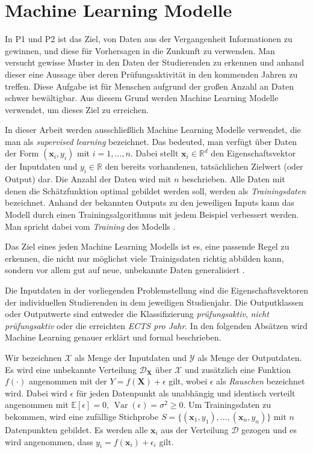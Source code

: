

\section{Machine Learning Modelle}
\label{sec:ml}

In P1 und P2 ist das Ziel, von Daten aus der Vergangenheit Informationen zu gewinnen, und diese f\"ur Vorhersagen in die Zunkunft zu verwenden.
Man versucht gewisse Muster in den Daten der Studierenden zu erkennen und anhand dieser eine Aussage \"uber deren Pr\"ufungsaktivit\"at in den kommenden Jahren zu treffen.
Diese Aufgabe ist f\"ur Menschen aufgrund der gro{\ss}en Anzahl an Daten schwer bew\"altigbar. Aus diesem Grund werden Machine Learning Modelle verwendet,
um dieses Ziel zu erreichen.

In dieser Arbeit werden ausschlie{\ss}lich Machine Learning Modelle verwendet, die man als \textit{supervised learning} bezeichnet.
Das bedeuted, man verf\"ugt \"uber Daten der Form $(\mathbf{x}_i, y_i)$ mit $i = 1,\dots,n$. Dabei stellt $\mathbf{x}_i \in \mathbb{R}^d$ den Eigenschaftsvektor
der Inputdaten und $y_i \in \mathbb{R}$ den bereits vorhandenen, tats\"achlichen Zielwert (oder Output) dar. Die Anzahl der Daten wird mit $n$ beschrieben. Alle Daten mit denen die
Sch\"atzfunktion optimal gebildet werden soll, werden als \textit{Trainingsdaten} bezeichnet.
Anhand der bekannten Outputs zu den jeweiligen Inputs kann das Modell durch einen Trainingsalgorithmus mit jedem Beispiel verbessert werden.
Man spricht dabei vom \textit{Training} des Modells \cite[Seiten 19 bis 25]{shalev}.

Das Ziel eines jeden Machine Learning Modells ist es, eine passende Regel zu erkennen, die nicht nur m\"oglichst viele Trainigsdaten richtig abbilden kann, sondern vor allem
gut auf neue, unbekannte Daten generalisiert \cite[Seite 371]{strang}. 

Die Inputdaten in der vorliegenden Problemstellung sind die Eigenschaftsvektoren der individuellen Studierenden in dem jeweiligen Studienjahr. Die Outputklassen oder
Outputwerte sind entweder die Klassifizierung \textit{pr\"ufungsaktiv}, \textit{nicht pr\"ufungsaktiv} oder die erreichten \textit{ECTS pro Jahr}.
In den folgenden Abs\"atzen wird Machine Learning genauer erkl\"art und formal beschrieben.



Wir bezeichnen $\mathcal{X}$ als Menge der Inputdaten und $\mathcal{Y}$ als Menge der Outputdaten. Es wird eine unbekannte Verteilung $\mathcal{D}_{\mathbf{X}}$ \"uber
$\mathcal{X}$ und zus\"atzlich eine Funktion $f(\cdot)$ angenommen mit der $Y = f(\mathbf{X}) + \epsilon$ gilt, wobei $\epsilon$ als \textit{Rauschen} bezeichnet wird.
Dabei wird $\epsilon$ f\"ur jeden Datenpunkt als unabh\"angig und identisch verteilt angenommen mit
$\mathbb{E}[\epsilon] = 0$, $\operatorname{Var}(\epsilon) = \sigma^2 \geq 0$.
Um Trainingsdaten zu bekommen, wird eine zuf\"allige Stichprobe $S = \{(\mathbf{x}_1, y_1), \dots ,
	(\mathbf{x}_n, y_n)\}$ mit $n$ Datenpunkten gebildet. Es werden alle $\mathbf{x}_i$ aus der Verteilung $\mathcal{D}$ gezogen und es wird
angenommen, dass $y_i = f(\mathbf{x}_i) + \epsilon_i $ gilt.


